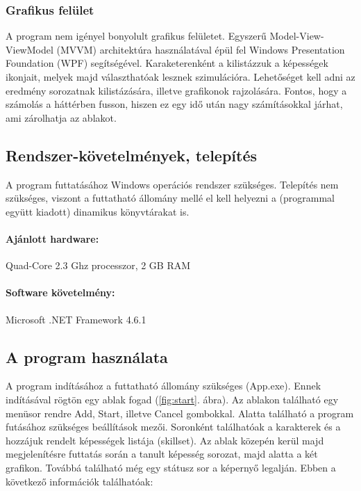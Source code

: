 \documentclass[12pt]{article}
\begin{document}
	\subsubsection{Grafikus felület}
	
	A program nem igényel bonyolult grafikus felületet. Egyszerű Model-View-ViewModel (MVVM) architektúra használatával épül fel Windows Presentation Foundation (WPF) segítségével. 
	Karaketerenként a kilistázzuk a képességek ikonjait, melyek majd választhatóak lesznek szimulációra. Lehetőséget kell adni az eredmény sorozatnak kilistázására, illetve grafikonok rajzolására.
	Fontos, hogy a számolás a háttérben fusson, hiszen ez egy idő után nagy számításokkal járhat, ami zárolhatja az ablakot.
	
	\subsection{Rendszer-követelmények, telepítés}
	
	A program futtatásához Windows operációs rendszer szükséges. Telepítés nem szükséges, viszont a futtatható állomány mellé el kell helyezni a (programmal együtt kiadott) dinamikus könyvtárakat is.
	
	\paragraph{Ajánlott hardware:} 
	
	Quad-Core 2.3 Ghz processzor, 2 GB RAM
	
	\paragraph{Software követelmény:} 
	
	Microsoft .NET Framework 4.6.1
	
	\subsection{A program használata}
	
	A program indításához a futtatható állomány szükséges (App.exe). Ennek indításával rögtön egy ablak fogad (\ref{fig:start}. ábra). Az ablakon található egy menüsor rendre Add, Start, illetve Cancel gombokkal. Alatta található a program futásához szükséges beállítások mezői. Soronként találhatóak a karakterek és a hozzájuk rendelt képességek listája (skillset). Az ablak közepén kerül majd megjelenítésre futtatás során a tanult képesség sorozat, majd alatta a két grafikon. Továbbá található még egy státusz sor a képernyő legalján. Ebben a következő információk találhatóak: 
	
\end{document}
